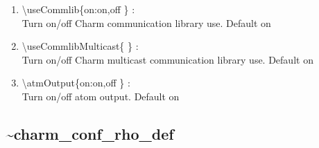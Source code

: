 \documentclass[12pt,titlepage]{article}
\begin{document}
\begin{enumerate}
  \vspace{0.15in} 
  \item  \textbackslash{}useCommlib\{on:on,off \} : \\
  Turn on/off Charm communication library use. Default on
  \vspace{0.15in} 
  \item  \textbackslash{}useCommlibMulticast\{ \} : \\   
  \vspace{0.15in} 
  Turn on/off Charm multicast communication library use. Default on
  \item  \textbackslash{}atmOutput\{on:on,off \} : \\   
  Turn on/off atom output. Default on
\end{enumerate}

\newpage
\subsection*{\bf \~{ }charm\_conf\_rho\_def}
\end{document}
